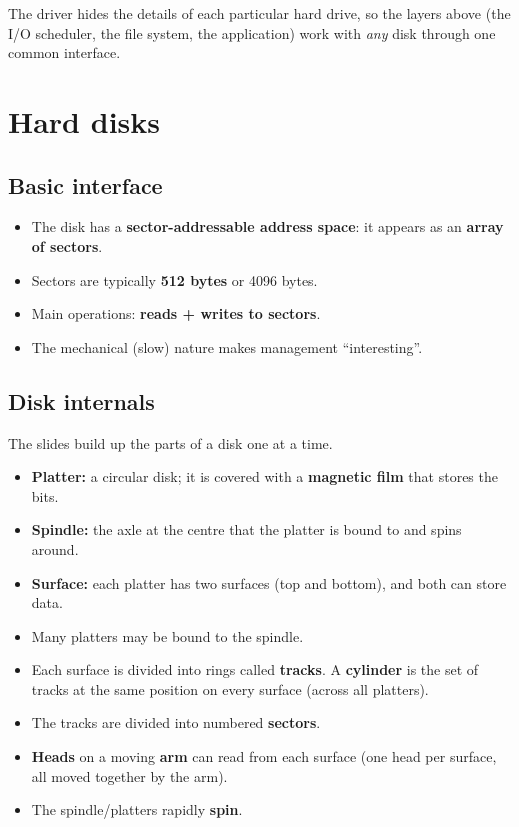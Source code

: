 \documentclass[11pt,a4paper]{article}
\begin{document}
The driver hides the details of each particular hard drive, so the layers
above (the I/O scheduler, the file system, the application) work with
\emph{any} disk through one common interface.

\section{Hard disks}

\subsection{Basic interface}

\begin{itemize}
  \item The disk has a \textbf{sector-addressable address space}: it appears
        as an \textbf{array of sectors}.
  \item Sectors are typically \textbf{512 bytes} or 4096 bytes.
  \item Main operations: \textbf{reads + writes to sectors}.
  \item The mechanical (slow) nature makes management ``interesting''.
\end{itemize}

\subsection{Disk internals}

The slides build up the parts of a disk one at a time.

\begin{itemize}
  \item \textbf{Platter:} a circular disk; it is covered with a
        \textbf{magnetic film} that stores the bits.
  \item \textbf{Spindle:} the axle at the centre that the platter is bound to
        and spins around.
  \item \textbf{Surface:} each platter has two surfaces (top and bottom),
        and both can store data.
  \item Many platters may be bound to the spindle.
  \item Each surface is divided into rings called \textbf{tracks}. A
        \textbf{cylinder} is the set of tracks at the same position on every
        surface (across all platters).
  \item The tracks are divided into numbered \textbf{sectors}.
  \item \textbf{Heads} on a moving \textbf{arm} can read from each surface
        (one head per surface, all moved together by the arm).
  \item The spindle/platters rapidly \textbf{spin}.
\end{itemize}
\end{document}
